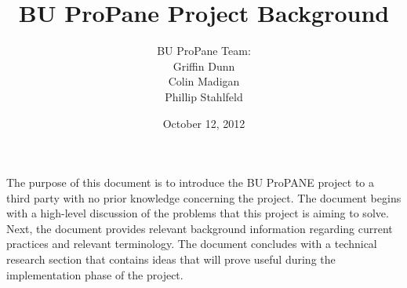 \documentclass{article}
\begin{document}
	\begin{titlepage}

		\title{\textbf{BU ProPane Project Background}}
		\author{BU ProPane Team:\\Griffin Dunn\\Colin Madigan\\Phillip Stahlfeld}
		\date{October 12, 2012}
		\maketitle
		\noindent
		The purpose of this document is to introduce the BU ProPANE project to a third party with no prior knowledge concerning the project. The document begins with a high-level discussion of the problems that this project is aiming to solve. Next, the document provides relevant background information regarding current practices and relevant terminology. The document concludes with a technical research section that contains ideas that will prove useful during the implementation phase of the project. 
		
		\thispagestyle{empty}
	
		
	\end{titlepage}



	\thispagestyle{empty}
\end{document}
